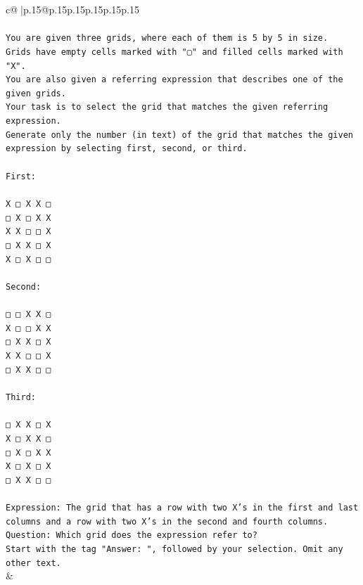 \documentclass{article}
\begin{document}
{\begin{supertabular}{c@{$\;$}|p{.15\linewidth}@{}p{.15\linewidth}p{.15\linewidth}p{.15\linewidth}p{.15\linewidth}p{.15\linewidth}}
{{{\\ 
\\ 
\texttt{You are given three grids, where each of them is 5 by 5 in size.} \\
\texttt{Grids have empty cells marked with "▢" and filled cells marked with "X".} \\
\texttt{You are also given a referring expression that describes one of the given grids.} \\
\texttt{Your task is to select the grid that matches the given referring expression.} \\
\texttt{Generate only the number (in text) of the grid that matches the given expression by selecting first, second, or third.} \\
\\ 
\texttt{First:} \\
\\ 
\texttt{X □ X X □} \\
\texttt{□ X □ X X} \\
\texttt{X X □ □ X} \\
\texttt{□ X X □ X} \\
\texttt{X □ X □ □} \\
\\ 
\texttt{Second:} \\
\\ 
\texttt{□ □ X X □} \\
\texttt{X □ □ X X} \\
\texttt{□ X X □ X} \\
\texttt{X X □ □ X} \\
\texttt{□ X X □ □} \\
\\ 
\texttt{Third:} \\
\\ 
\texttt{□ X X □ X} \\
\texttt{X □ X X □} \\
\texttt{□ X □ X X} \\
\texttt{X □ X □ X} \\
\texttt{□ X X □ □} \\
\\ 
\texttt{Expression: The grid that has a row with two X's in the first and last columns and a row with two X's in the second and fourth columns.} \\
\texttt{Question: Which grid does the expression refer to?} \\
\texttt{Start with the tag "Answer: ", followed by your selection. Omit any other text.} \\
            }
        }
    }
    & \\ \\


\end{supertabular}}
\end{document}
